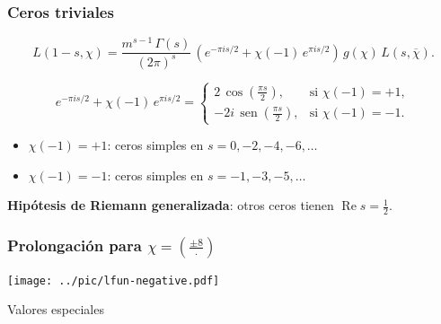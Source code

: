 \documentclass[handout]{beamer}
\renewcommand{\Re}{\operatorname{Re}}
\renewcommand{\sin}{\operatorname{sen}}
\begin{document}
\begin{frame}
  \frametitle{Ceros triviales}

  \[ L (1-s,\chi) = \frac{m^{s-1}\,\Gamma (s)}{(2\pi)^s} \, \left(e^{-\pi i s/2} + \chi (-1)\,e^{\pi i s/2}\right)\,g (\chi) \, L (s,\overline{\chi}). \]

  \[ e^{-\pi i s/2} + \chi (-1)\,e^{\pi i s/2} = \begin{cases}
  2 \, \cos \left(\frac{\pi s}{2}\right), & \text{si }\chi (-1) = +1,\\
  -2i \, \sin \left(\frac{\pi s}{2}\right), & \text{si }\chi (-1) = -1.
  \end{cases} \]

  \begin{itemize}
  \item $\chi (-1) = +1$: ceros simples en $s = 0, -2, -4, -6, \ldots$

  \item $\chi (-1) = -1$: ceros simples en $s = -1, -3, -5, \ldots$
  \end{itemize}

  \textbf{Hipótesis de Riemann generalizada}: otros ceros tienen
  $\Re s = \frac{1}{2}$.
\end{frame}


\begin{frame}
  \frametitle{Prolongación para $\chi = \left(\frac{\pm 8}{\cdot}\right)$}

  \begin{center}  
    \texttt{[image: ../pic/lfun-negative.pdf]}
  \end{center}
\end{frame}


\begin{frame}[plain]
  \headingfont

  \begin{center}
    {\huge Valores especiales}
  \end{center}
\end{frame}

\end{document}
